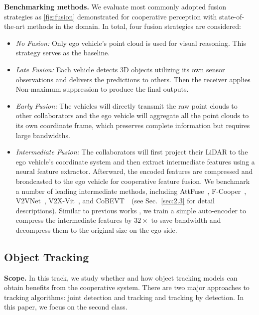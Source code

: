 \documentclass[10pt,twocolumn,letterpaper]{article}
\begin{document}
\noindent\textbf{Benchmarking methods.} We evaluate most commonly adopted fusion strategies as \cref{fig:fusion} demonstrated for cooperative perception with state-of-the-art methods in the domain. In total, four fusion strategies are considered:
\begin{itemize}
     \setlength{\parskip}{0pt}
  \setlength{\itemsep}{0pt plus 0pt}
    \item \textit{No Fusion:} Only ego vehicle's point cloud is used for visual reasoning. This strategy serves as the baseline.
    \item \textit{Late Fusion:} Each vehicle detects 3D objects utilizing its own sensor observations and delivers the predictions to others. Then the receiver applies Non-maximum suppression to produce the final outputs.
    \item \textit{Early Fusion:} The vehicles will directly transmit the raw point clouds to other collaborators and the ego vehicle will aggregate all the point clouds to its own coordinate frame, which preserves complete information but requires large bandwidths.
    \item \textit{Intermediate Fusion:} The collaborators will first project their LiDAR to the ego vehicle's coordinate system and then extract intermediate features using a neural feature extractor. Afterward, the encoded features are compressed and broadcasted to the ego vehicle for cooperative feature fusion. We benchmark a number of leading intermediate methods, including AttFuse~\cite{xu2022opv2v}, F-Cooper~\cite{chen2019f}, V2VNet~\cite{wang2020v2vnet}, V2X-Vit~\cite{xu2022v2xvit}, and CoBEVT~\cite{xu2022cobevt}~(see Sec.~\ref{sec:2.3} for detail descriptions). Similar to previous works \cite{xu2022cobevt, xu2022opv2v, xu2022v2xvit}, we train a simple auto-encoder to compress the intermediate features by $32\times$ to save bandwidth and decompress them to the original size on the ego side.
    
\end{itemize}


\subsection{Object Tracking}
\noindent\textbf{Scope.} In this track, we study whether and how object tracking models can obtain benefits from the cooperative system. There are two major approaches to tracking algorithms: joint detection and tracking and tracking by detection. In this paper, we focus on the second class.
\end{document}
